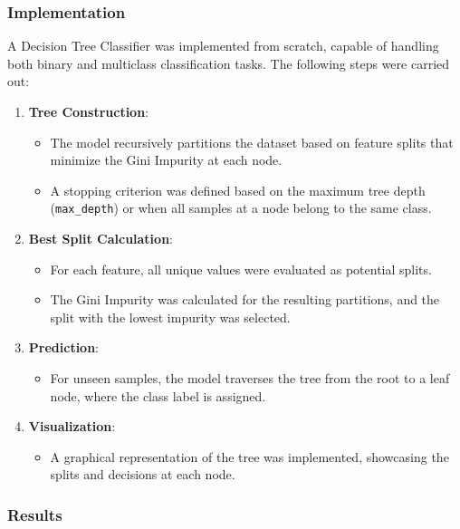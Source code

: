 \documentclass[12pt]{article}
\begin{document}
\subsubsection{Implementation}

A Decision Tree Classifier was implemented from scratch, capable of handling both binary and multiclass classification tasks. The following steps were carried out:

\begin{enumerate}
    \item \textbf{Tree Construction}:
    \begin{itemize}
        \item The model recursively partitions the dataset based on feature splits that minimize the Gini Impurity at each node.
        \item A stopping criterion was defined based on the maximum tree depth (\texttt{max\_depth}) or when all samples at a node belong to the same class.
    \end{itemize}

    \item \textbf{Best Split Calculation}:
    \begin{itemize}
        \item For each feature, all unique values were evaluated as potential splits.
        \item The Gini Impurity was calculated for the resulting partitions, and the split with the lowest impurity was selected.
    \end{itemize}

    \item \textbf{Prediction}:
    \begin{itemize}
        \item For unseen samples, the model traverses the tree from the root to a leaf node, where the class label is assigned.
    \end{itemize}

    \item \textbf{Visualization}:
    \begin{itemize}
        \item A graphical representation of the tree was implemented, showcasing the splits and decisions at each node.
    \end{itemize}
\end{enumerate}

\subsubsection{Results}
\end{document}
